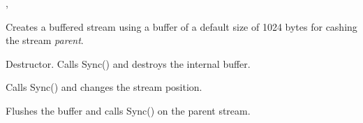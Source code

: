 , 


\label{wxbufferedoutputstreamctor}


Creates a buffered stream using a buffer of a default size of 1024 bytes for cashing
the stream {\it parent}.

\label{wxbufferedoutputstreamdtor}


Destructor. Calls Sync() and destroys the internal buffer.

\label{wxbufferedoutputstreamseeko}


Calls Sync() and changes the stream position.

\label{wxbufferedoutputstreamsync}


Flushes the buffer and calls Sync() on the parent stream.



